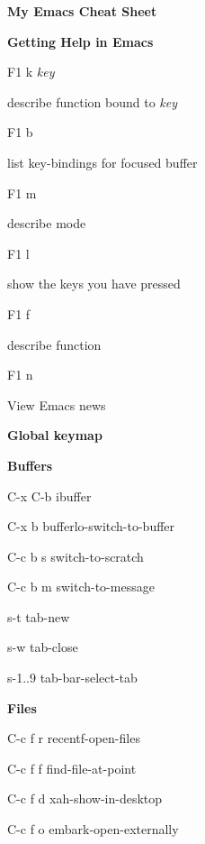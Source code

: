 \documentclass[10pt]{article}
\renewcommand\section[1]{\bigskip\par\textbf{\color{heading}\large#1}\smallskip}
\renewcommand\subsection[1]{\smallskip\par\textbf{\color{heading}#1}}
\newcommand\humanreadable[1]{{\par\color{default}\small\sffamily#1}}
\newcommand\meta[1]{\textlangle\textit{#1}\textrangle}
\begin{document}
\author{Jousimies}
\begin{multicols}{4}

  \setlength{\columnsep}{1cm}
  \begin{center}
    \LARGE\color{heading}\textbf{My Emacs Cheat Sheet}
  \end{center}

  \section{Getting Help in Emacs}
  \begin{keylist}
  \item[F1 k \meta{key}] \humanreadable{describe function bound to \meta{key}}
  \item[F1 b] \humanreadable{list key-bindings for focused buffer}
  \item[F1 m] \humanreadable{describe mode}
  \item[F1 l] \humanreadable{show the keys you have pressed}
  \item[F1 f] \humanreadable{describe function}
  \item[F1 n] \humanreadable{View Emacs news}
  \end{keylist}

  \section{Global keymap}

  \subsection{Buffers}
  \begin{keylist}
  \item[C-x C-b] ibuffer
  \item[C-x b] bufferlo-switch-to-buffer
  \item[C-c b s] switch-to-scratch
  \item[C-c b m] switch-to-message
  \item[s-t] tab-new
  \item[s-w] tab-close
  \item[s-1..9] tab-bar-select-tab
  \end{keylist}

  \subsection{Files}
  \begin{keylist}
  \item[C-c f r] recentf-open-files
  \item[C-c f f] find-file-at-point
  \item[C-c f d] xah-show-in-desktop
  \item[C-c f o] embark-open-externally
  \end{keylist}


\end{multicols}
\end{document}
